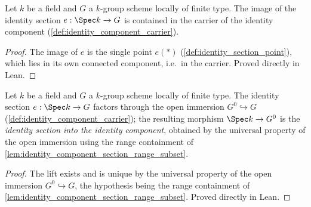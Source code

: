 \begin{lemma}\leanok
  \label{lem:identity_component_section_range_subset}
  Let \(k\) be a field and \(G\) a \(k\)-group scheme locally of finite
  type. The image of the identity section \(e : \Spec k \to G\) is
  contained in the carrier of the identity component
  (\cref{def:identity_component_carrier}).
\end{lemma}
\begin{proof}
  The image of \(e\) is the single point \(e(\ast)\)
  (\cref{def:identity_section_point}), which lies in its own connected
  component, i.e.\ in the carrier. Proved directly in Lean.
\end{proof}

\begin{definition}\leanok
  \label{def:identity_component_section}
  Let \(k\) be a field and \(G\) a \(k\)-group scheme locally of finite
  type. The identity section \(e : \Spec k \to G\) factors through the
  open immersion \(G^0 \hookrightarrow G\)
  (\cref{def:identity_component_carrier}); the resulting morphism
  \(\Spec k \to G^0\) is the \emph{identity section into the identity
  component}, obtained by the universal property of the open immersion
  using the range containment of
  \cref{lem:identity_component_section_range_subset}.
\end{definition}
\begin{proof}
  The lift exists and is unique by the universal property of the open
  immersion \(G^0 \hookrightarrow G\), the hypothesis being the range
  containment of \cref{lem:identity_component_section_range_subset}.
  Proved directly in Lean.
\end{proof}

